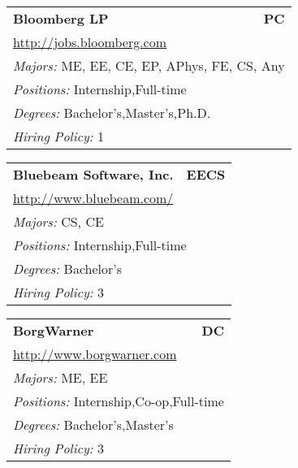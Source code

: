 \documentclass[twoside]{article}
\begin{document}
\begin{center}
\begin{multicols}{3}
\begin{FlushLeft}
\begin{minipage}{.9\columnwidth}
\end{minipage}
 
\begin{minipage}{.9\columnwidth}\begin{tabularx}{.95\columnwidth}{Xr}
                 {\Large\bf Bloomberg LP} & {\Large\bf PC}\\
    \multicolumn{2}{p{.95\columnwidth}}{\url{http://jobs.bloomberg.com}}\\
    \multicolumn{2}{p{.95\columnwidth}}{\emph{Majors:} ME, EE, CE, EP, APhys, FE, CS, Any}\\
    \multicolumn{2}{p{.95\columnwidth}}{\emph{Positions:} Internship,Full-time}\\
    \multicolumn{2}{p{.95\columnwidth}}{\emph{Degrees:} Bachelor's,Master's,Ph.D.}\\
    \multicolumn{2}{p{.95\columnwidth}}{\emph{Hiring Policy:} 1}\\
    \end{tabularx}
    
\end{minipage}
 
\begin{minipage}{.9\columnwidth}\begin{tabularx}{.95\columnwidth}{Xr}
                 {\Large\bf Bluebeam Software, Inc.} & {\Large\bf EECS}\\
    \multicolumn{2}{p{.95\columnwidth}}{\url{http://www.bluebeam.com/}}\\
    \multicolumn{2}{p{.95\columnwidth}}{\emph{Majors:} CS, CE}\\
    \multicolumn{2}{p{.95\columnwidth}}{\emph{Positions:} Internship,Full-time}\\
    \multicolumn{2}{p{.95\columnwidth}}{\emph{Degrees:} Bachelor's}\\
    \multicolumn{2}{p{.95\columnwidth}}{\emph{Hiring Policy:} 3}\\
    \end{tabularx}
    
\end{minipage}
 
\begin{minipage}{.9\columnwidth}\begin{tabularx}{.95\columnwidth}{Xr}
                 {\Large\bf BorgWarner} & {\Large\bf DC}\\
    \multicolumn{2}{p{.95\columnwidth}}{\url{http://www.borgwarner.com}}\\
    \multicolumn{2}{p{.95\columnwidth}}{\emph{Majors:} ME, EE}\\
    \multicolumn{2}{p{.95\columnwidth}}{\emph{Positions:} Internship,Co-op,Full-time}\\
    \multicolumn{2}{p{.95\columnwidth}}{\emph{Degrees:} Bachelor's,Master's}\\
    \multicolumn{2}{p{.95\columnwidth}}{\emph{Hiring Policy:} 3}\\
    \end{tabularx}
    

\end{minipage}
\end{FlushLeft}
\end{multicols}
\end{center}
\end{document}
